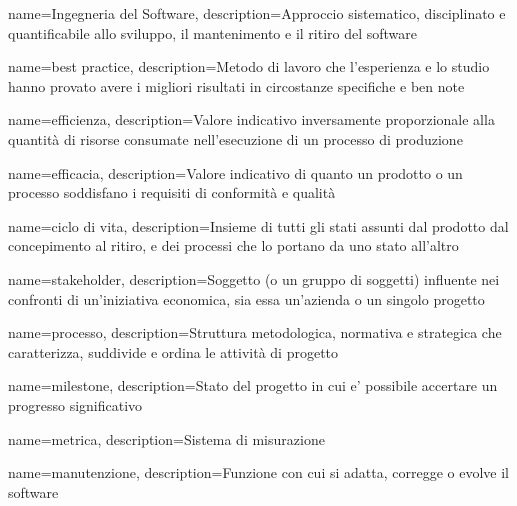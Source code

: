{
	name={Ingegneria del Software},
	description={Approccio sistematico, disciplinato e quantificabile allo sviluppo, il mantenimento e il ritiro del software}
}

{
	name={best practice},
	description={Metodo di lavoro che l'esperienza e lo studio hanno provato avere i migliori risultati in circostanze specifiche e ben note}
}

{
	name=efficienza,
	description={Valore indicativo inversamente proporzionale alla quantità di risorse consumate nell'esecuzione di un processo di produzione}
}

{
	name=efficacia,
	description={Valore indicativo di quanto un prodotto o un processo soddisfano i requisiti di conformità e qualità}
}

{
	name={ciclo di vita},
	description={Insieme di tutti gli stati assunti dal prodotto dal concepimento al ritiro, e dei processi che lo portano da uno stato all'altro}
}

{
	name=stakeholder,
	description={Soggetto (o un gruppo di soggetti) influente nei confronti di un'iniziativa economica, sia essa un'azienda o un singolo progetto}
}

{
	name={processo},
	description={Struttura metodologica, normativa e strategica che caratterizza, suddivide e ordina le attività di progetto}
}

{
	name={milestone},
	description={Stato del progetto in cui e' possibile accertare un progresso significativo}
}

{
	name=metrica,
	description={Sistema di misurazione}
}

{
        name=manutenzione,
        description={Funzione con cui si adatta, corregge o evolve il software}
}
